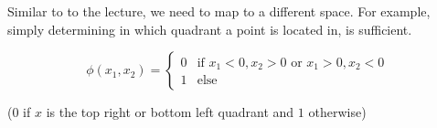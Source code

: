 %
%
\begin{flushleft}
Similar to to the lecture, we need to map to a different space. For example, simply determining in which quadrant a point is located in, is sufficient. 
\end{flushleft}
\[
\phi(x_1, x_2) = 
  \begin{cases} 
    0 & \text{if } x_1 < 0, x_2 > 0 \text{ or } x_1 > 0, x_2 < 0 \\
    1 & \text{else}
  \end{cases}
\]
\begin{flushleft}
($0$ if $x$ is the top right or bottom left quadrant and $1$ otherwise)
\end{flushleft}




